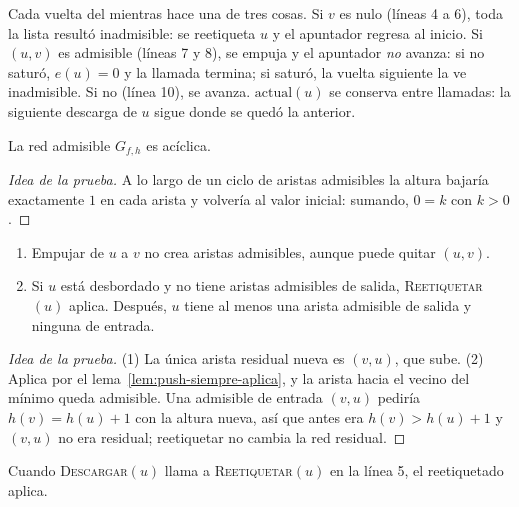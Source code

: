\documentclass[11pt,letterpaper]{article}
\begin{document}
Cada vuelta del mientras hace una de tres cosas. Si $v$ es nulo
(líneas 4 a 6), toda la lista resultó inadmisible: se reetiqueta $u$
y el apuntador regresa al inicio. Si $(u, v)$ es admisible (líneas 7
y 8), se empuja y el apuntador \emph{no} avanza: si no saturó,
$e(u) = 0$ y la llamada termina; si saturó, la vuelta siguiente la ve
inadmisible. Si no (línea 10), se avanza. $\text{actual}(u)$ se
conserva entre llamadas: la siguiente descarga de $u$ sigue donde se
quedó la anterior.

\begin{lema}
  \label{lem:push-admisible-aciclica}
  La red admisible $G_{f,h}$ es acíclica.
\end{lema}

\begin{proof}[Idea de la prueba]
  A lo largo de un ciclo de aristas admisibles la altura bajaría
  exactamente $1$ en cada arista y volvería al valor inicial: sumando,
  $0 = k$ con $k > 0$.
\end{proof}

\begin{lema}
  \label{lem:push-tras-reetiquetar}
  \begin{enumerate}
    \item Empujar de $u$ a $v$ no crea aristas admisibles, aunque puede
          quitar $(u, v)$.
    \item Si $u$ está desbordado y no tiene aristas admisibles de
          salida, \textsc{Reetiquetar}$(u)$ aplica. Después, $u$ tiene
          al menos una arista admisible de salida y ninguna de entrada.
  \end{enumerate}
\end{lema}

\begin{proof}[Idea de la prueba]
  (1) La única arista residual nueva es $(v, u)$, que sube. (2) Aplica
  por el lema~\ref{lem:push-siempre-aplica}, y la arista hacia el
  vecino del mínimo queda admisible. Una admisible de entrada $(v, u)$
  pediría $h(v) = h(u) + 1$ con la altura nueva, así que antes era
  $h(v) > h(u) + 1$ y $(v, u)$ no era residual; reetiquetar no cambia
  la red residual.
\end{proof}

\begin{lema}
  \label{lem:push-descargar-valido}
  Cuando \textsc{Descargar}$(u)$ llama a \textsc{Reetiquetar}$(u)$ en
  la línea 5, el reetiquetado aplica.
\end{lema}
\end{document}
